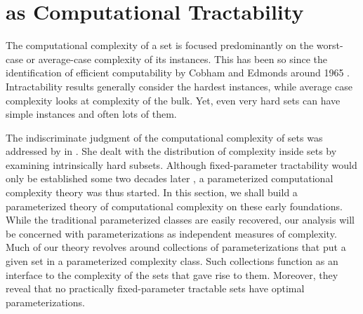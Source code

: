 \section{as Computational Tractability}

The computational complexity of a set is focused predominantly on the worst-case or average-case complexity of its instances.
This has been so since the identification of efficient computability by Cobham and Edmonds around 1965 \parencite[see][]{goldreich2008computational}.
Intractability results \parencite{cook1971complexity,garey1979computers} generally consider the hardest instances, while average case complexity looks at complexity of the bulk.
Yet, even very hard sets can have simple instances and often lots of them.

The indiscriminate judgment of the computational complexity of sets was addressed by \textcite{lynch1975reducibility} in \citeyear{lynch1975reducibility}.
She dealt with the distribution of complexity inside sets by examining intrinsically hard subsets.
Although fixed-parameter tractability would only be established some two decades later \parencite{downey1992fixed}, a parameterized computational complexity theory was thus started.
In this section, we shall build a parameterized theory of computational complexity on these early foundations.
While the traditional parameterized classes are easily recovered, our analysis will be concerned with parameterizations as independent measures of complexity.
Much of our theory revolves around collections of parameterizations that put a given set in a parameterized complexity class.
Such collections function as an interface to the complexity of the sets that gave rise to them.
Moreover, they reveal that no practically fixed-parameter tractable sets have optimal parameterizations.

